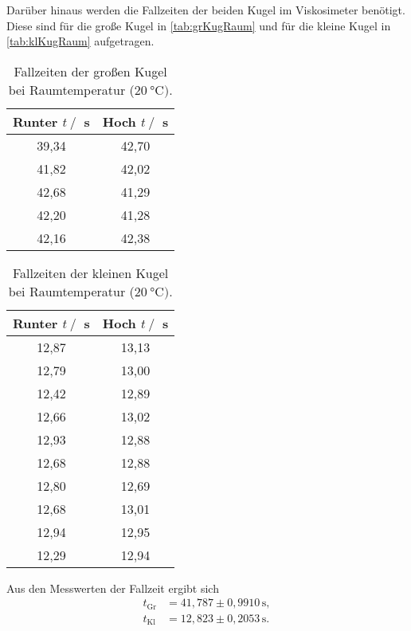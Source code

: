 Darüber hinaus werden die Fallzeiten der beiden Kugel im Viskosimeter benötigt. Diese sind für die große Kugel in \autoref{tab:grKugRaum} und für die kleine Kugel
in \autoref{tab:klKugRaum} aufgetragen.

\begin{table}[H]
  \centering
      \caption{Fallzeiten der großen Kugel bei Raumtemperatur ($\SI{20}{\celsius})$.}
      \label{tab:grKugRaum}
      \begin{tabular}{c c}
      \toprule
      Runter $t\:/\:$ s & Hoch $t\:/\:$ s\\
      \midrule
        39,34 & 42,70 \\
        41,82 & 42,02 \\
        42,68 & 41,29 \\
        42,20 & 41,28 \\
        42,16 & 42,38 \\
      \bottomrule
  \end{tabular}
\end{table}

\begin{table}[H]
  \centering
      \caption{Fallzeiten der kleinen Kugel bei Raumtemperatur ($\SI{20}{\celsius})$.}
      \label{tab:klKugRaum}
      \begin{tabular}{c c}
      \toprule
      Runter $t\:/\:$ s & Hoch $t\:/\:$ s\\
      \midrule
        12,87 & 13,13 \\
        12,79 & 13,00 \\
        12,42 & 12,89 \\
        12,66 & 13,02 \\
        12,93 & 12,88 \\
        12,68 & 12,88 \\
        12,80 & 12,69 \\
        12,68 & 13,01 \\
        12,94 & 12,95 \\
        12,29 & 12,94 \\
      \bottomrule
  \end{tabular}
\end{table}

Aus den Messwerten der Fallzeit ergibt sich
\begin{align*}
  t_{\text{Gr}} &= 41,787\pm 0,9910 \,\si{\second}, \\
  t_{\text{Kl}} &= 12,823\pm 0,2053 \,\si{\second}. \\
\end{align*}

